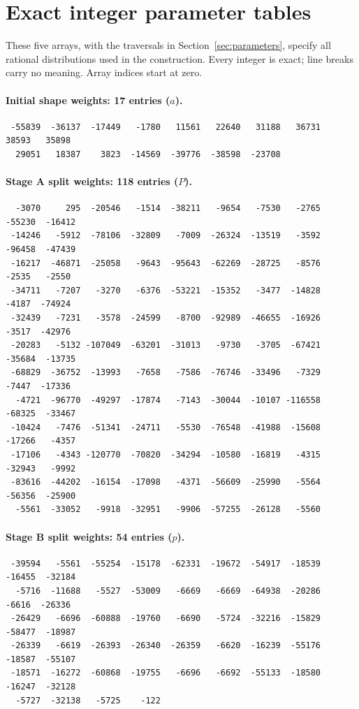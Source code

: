 \section{Exact integer parameter tables}\label{app:parameter-tables}
These five arrays, with the traversals in Section~\ref{sec:parameters},
specify all rational distributions used in the construction. Every integer is
exact; line breaks carry no meaning. Array indices start at zero.

\paragraph{Initial shape weights: 17 entries ($a$).}
{\footnotesize
\begin{verbatim}
 -55839  -36137  -17449   -1780   11561   22640   31188   36731   38593   35898
  29051   18387    3823  -14569  -39776  -38598  -23708
\end{verbatim}
}

\paragraph{Stage A split weights: 118 entries ($P$).}
{\footnotesize
\begin{verbatim}
  -3070     295  -20546   -1514  -38211   -9654   -7530   -2765  -55230  -16412
 -14246   -5912  -78106  -32809   -7009  -26324  -13519   -3592  -96458  -47439
 -16217  -46871  -25058   -9643  -95643  -62269  -28725   -8576   -2535   -2550
 -34711   -7207   -3270   -6376  -53221  -15352   -3477  -14828   -4187  -74924
 -32439   -7231   -3578  -24599   -8700  -92989  -46655  -16926   -3517  -42976
 -20283   -5132 -107049  -63201  -31013   -9730   -3705  -67421  -35684  -13735
 -68829  -36752  -13993   -7658   -7586  -76746  -33496   -7329   -7447  -17336
  -4721  -96770  -49297  -17874   -7143  -30044  -10107 -116558  -68325  -33467
 -10424   -7476  -51341  -24711   -5530  -76548  -41988  -15608  -17266   -4357
 -17106   -4343 -120770  -70820  -34294  -10580  -16819   -4315  -32943   -9992
 -83616  -44202  -16154  -17098   -4371  -56609  -25990   -5564  -56356  -25900
  -5561  -33052   -9918  -32951   -9906  -57255  -26128   -5560
\end{verbatim}
}

\paragraph{Stage B split weights: 54 entries ($p$).}
{\footnotesize
\begin{verbatim}
 -39594   -5561  -55254  -15178  -62331  -19672  -54917  -18539  -16455  -32184
  -5716  -11688   -5527  -53009   -6669   -6669  -64938  -20286   -6616  -26336
 -26429   -6696  -60888  -19760   -6690   -5724  -32216  -15829  -58477  -18987
 -26339   -6619  -26393  -26340  -26359   -6620  -16239  -55176  -18587  -55107
 -18571  -16272  -60868  -19755   -6696   -6692  -55133  -18580  -16247  -32128
  -5727  -32138   -5725    -122
\end{verbatim}
}

